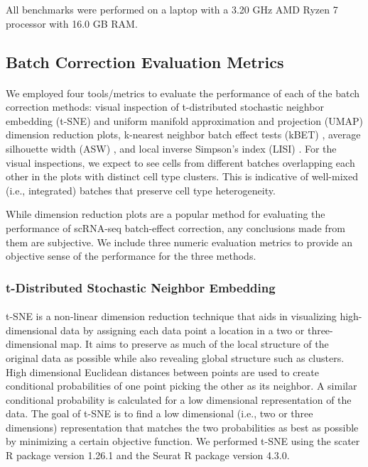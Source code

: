 \documentclass[
12pt, %
letterpaper, %
oneside, %
headinclude,footinclude, %
BCOR5mm, %
]{scrartcl}
\begin{document}
All benchmarks were performed on a laptop with a 3.20 GHz AMD Ryzen 7 processor with 16.0 GB RAM.


\subsection{Batch Correction Evaluation Metrics}

\paragraph*{}
We employed four tools/metrics to evaluate the performance of each of the batch correction methods: visual inspection of t-distributed stochastic neighbor embedding (t-SNE) \citep{van2008visualizing} and uniform manifold approximation and projection (UMAP) \citep{mcinnes2018umap} dimension reduction plots, k-nearest neighbor batch effect tests (kBET) \citep{buttner2019test}, average silhouette width (ASW) \citep{rousseeuw1987silhouettes}, and local inverse Simpson's index (LISI) \citep{korsunsky2019fast}. For the visual inspections, we expect to see cells from different batches overlapping each other in the plots with distinct cell type clusters. This is indicative of well-mixed (i.e., integrated) batches that preserve cell type heterogeneity.

While dimension reduction plots are a popular method for evaluating the performance of scRNA-seq batch-effect correction, any conclusions made from them are subjective. We include three numeric evaluation metrics to provide an objective sense of the performance for the three methods.

\subsubsection*{t-Distributed Stochastic Neighbor Embedding}

\paragraph*{}
t-SNE is a non-linear dimension reduction technique \citep{van2008visualizing} that aids in visualizing high-dimensional data by assigning each data point a location in a two or three-dimensional map. It aims to preserve as much of the local structure of the original data as possible while also revealing global structure such as clusters. High dimensional Euclidean distances between points are used to create conditional probabilities of one point picking the other as its neighbor. A similar conditional probability is calculated for a low dimensional representation of the data. The goal of t-SNE is to find a low dimensional (i.e., two or three dimensions) representation that matches the two probabilities as best as possible by minimizing a certain objective function. We performed t-SNE using the scater R package \citep{davis2017scater} version 1.26.1 and the Seurat R package \citep{stuart2019comprehensive} version 4.3.0.
\end{document}
